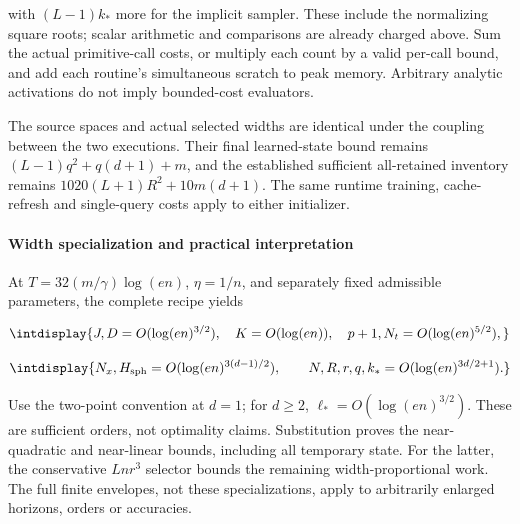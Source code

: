 with \((L-1)k_*\) more for the implicit sampler. These include the normalizing square roots; scalar arithmetic and comparisons are already charged above. Sum the actual primitive-call costs, or multiply each count by a valid per-call bound, and add each routine's simultaneous scratch to peak memory. Arbitrary analytic activations do not imply bounded-cost evaluators.



The source spaces and actual selected widths are identical under the coupling between the two executions. Their final learned-state bound remains \((L-1)q^2+q(d+1)+m\), and the established sufficient all-retained inventory remains \(1020(L+1)R^2+10m(d+1)\). The same runtime training, cache-refresh and single-query costs apply to either initializer.


\paragraph{Width specialization and practical interpretation}
\label{int:harmonic-efficient-specialization}
\mbox{}\par\smallskip


At \(T=32(m/\gamma)\log(en)\), \(\eta=1/n\), and separately fixed admissible parameters, the complete recipe yields


\begingroup\renewcommand{\theHequation}{intdisplay.231}
\begin{equation*}
\intdisplay{
J,D=O(\log(en)^{3/2}),\quad K=O(\log(en)),\quad
p+1,N_t=O(\log(en)^{5/2}),
}
\end{equation*}
\endgroup

\begingroup\renewcommand{\theHequation}{intdisplay.232}
\begin{equation}
\intdisplay{
N_x,H_{\rm sph}=O(\log(en)^{3(d-1)/2}),\qquad
N,R,r,q,k_*=O(\log(en)^{3d/2+1}).
}
\label{int:eq-0110-setup-specialized-orders}
\end{equation}
\endgroup


Use the two-point convention at \(d=1\); for \(d\ge2\), \(\ell_*=O(\log(en)^{3/2})\). These are sufficient orders, not optimality claims. Substitution proves the near-quadratic and near-linear bounds, including all temporary state. For the latter, the conservative \(Lnr^3\) selector bounds the remaining width-proportional work. The full finite envelopes, not these specializations, apply to arbitrarily enlarged horizons, orders or accuracies.

